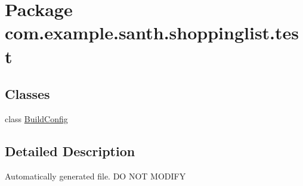 \hypertarget{namespacecom_1_1example_1_1santh_1_1shoppinglist_1_1test}{}\section{Package com.\+example.\+santh.\+shoppinglist.\+test}
\label{namespacecom_1_1example_1_1santh_1_1shoppinglist_1_1test}
\subsection*{Classes}
\begin{DoxyCompactItemize}
\item 
class \hyperlink{classcom_1_1example_1_1santh_1_1shoppinglist_1_1test_1_1_build_config}{Build\+Config}
\end{DoxyCompactItemize}


\subsection{Detailed Description}
Automatically generated file. DO N\+OT M\+O\+D\+I\+FY 